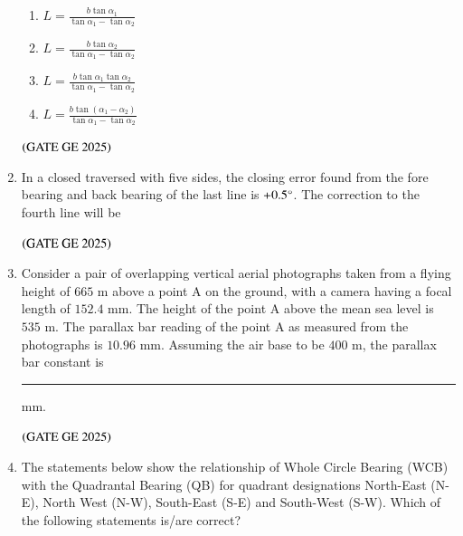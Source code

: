\documentclass[journal,12pt,onecolumn]{IEEEtran}
\theoremstyle{remark}
\begin{document}
\begin{enumerate}
\begin{figure}[H]
    \caption{}
    \label{figs:fig9}
\end{figure}
\begin{enumerate}
\item $L = \frac{b \tan{\alpha_1}}{\tan{\alpha_1} - \tan{\alpha_2}}$
\item $L = \frac{b \tan{\alpha_2}}{\tan{\alpha_1} - \tan{\alpha_2}}$
\item $L = \frac{b \tan{\alpha_1} \tan{\alpha_2}}{\tan{\alpha_1} - \tan{\alpha_2}}$
\item $L = \frac{b \tan{(\alpha_1 - \alpha_2)}}{\tan{\alpha_1} - \tan{\alpha_2}}$
\end{enumerate}
\hfill $\left(\text{GATE GE 2025}\right)$
\bigskip
\item In a closed traversed with five sides, the closing error found from the fore bearing and back bearing of the last line is $+0.5\degree$. The correction to the fourth line will be
\begin{enumerate}
\end{enumerate}
\hfill $\left(\text{GATE GE 2025}\right)$
\bigskip
\item Consider a pair of overlapping vertical aerial photographs taken from a flying height of $665$ m above a point A on the ground, with a camera having a focal length of $152.4$ mm. The height of the point A above the mean sea level is $535$ m. The parallax bar reading of the point A as measured from the photographs is $10.96$ mm. Assuming the air base to be $400$ m, the parallax bar constant is \rule{2cm}{0.5mm} mm.
\begin{enumerate}
\end{enumerate}
\hfill $\left(\text{GATE GE 2025}\right)$
\bigskip
\item The statements below show the relationship of Whole Circle Bearing (WCB) with the Quadrantal Bearing (QB) for quadrant designations North-East (N-E), North West (N-W), South-East (S-E) and South-West (S-W). Which of the following statements is/are correct?

\end{enumerate}
\end{document}
